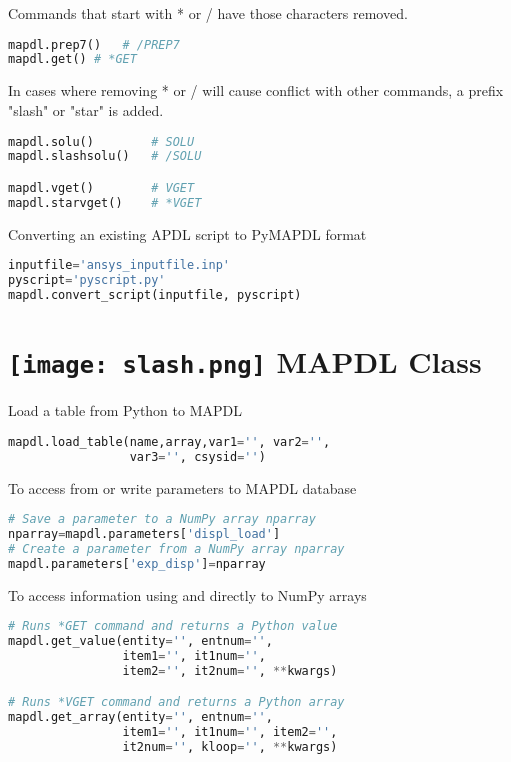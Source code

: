 \documentclass[9pt,landscape]{article}
\begin{document}
\begin{multicols}{3}
Commands that start with * or / have those characters removed.
\begin{lstlisting}[language=Python]
mapdl.prep7()	# /PREP7
mapdl.get()	# *GET
\end{lstlisting}

In cases where removing * or / will cause conflict with other commands, a prefix "slash" or "star" is added.
\begin{lstlisting}[language=Python]
mapdl.solu()		# SOLU
mapdl.slashsolu()	# /SOLU

mapdl.vget()		# VGET
mapdl.starvget()	# *VGET
\end{lstlisting} 

\columnbreak
Converting an existing APDL script to PyMAPDL format
\begin{lstlisting}[language=Python]
inputfile='ansys_inputfile.inp'
pyscript='pyscript.py'
mapdl.convert_script(inputfile, pyscript)
\end{lstlisting} 

\section{\texttt{[image: slash.png]} MAPDL Class}
Load a table from Python to MAPDL
\begin{lstlisting}[language=Python]
mapdl.load_table(name,array,var1='', var2='',
                 var3='', csysid='')
\end{lstlisting} 

To access from or write parameters to MAPDL database
\begin{lstlisting}[language=Python]
# Save a parameter to a NumPy array nparray
nparray=mapdl.parameters['displ_load']
# Create a parameter from a NumPy array nparray
mapdl.parameters['exp_disp']=nparray
\end{lstlisting} 

To access information using  and  directly to NumPy arrays
\begin{lstlisting}[language=Python]
# Runs *GET command and returns a Python value
mapdl.get_value(entity='', entnum='',
                item1='', it1num='',
                item2='', it2num='', **kwargs)

# Runs *VGET command and returns a Python array
mapdl.get_array(entity='', entnum='',
                item1='', it1num='', item2='',
                it2num='', kloop='', **kwargs)
\end{lstlisting} 


\end{multicols}
\end{document}
